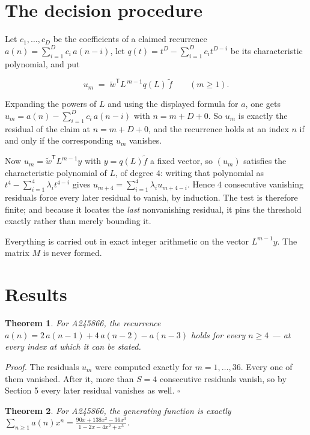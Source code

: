 \documentclass[11pt]{article}
\newtheorem{theorem}{Theorem}
\theoremstyle{definition}
\begin{document}
\section{The decision procedure}

Let $c_1,\dots,c_D$ be the coefficients of a claimed recurrence $a(n) = \sum_{i=1}^{D} c_i\,a(n-i)$, let $q(t) = t^{D} - \sum_{i=1}^{D} c_i t^{D-i}$ be its characteristic polynomial, and put

\[u_m \;=\; \tilde w^{\mathsf T} L^{\,m-1} q(L)\,\tilde f \qquad (m \ge 1).\]

Expanding the powers of $L$ and using the displayed formula for $a$, one gets $u_m = a(n) - \sum_{i=1}^{D} c_i\,a(n-i)$ with $n = m + D + 0$. So $u_m$ is exactly the residual of the claim at $n = m + D + 0$, and the recurrence holds at an index $n$ if and only if the corresponding $u_m$ vanishes.

Now $u_m = \tilde w^{\mathsf T} L^{m-1} y$ with $y = q(L)\tilde f$ a fixed vector, so $(u_m)$ satisfies the characteristic polynomial of $L$, of degree $4$: writing that polynomial as $t^{4} - \sum_{i=1}^{4} \lambda_i t^{4-i}$ gives $u_{m+4} = \sum_{i=1}^{4} \lambda_i u_{m+4-i}$. Hence $4$ consecutive vanishing residuals force every later residual to vanish, by induction. The test is therefore finite; and because it locates the {\itshape last} nonvanishing residual, it pins the threshold exactly rather than merely bounding it.

Everything is carried out in exact integer arithmetic on the vector $L^{m-1}y$. The matrix $M$ is never formed.

\section{Results}

\begin{theorem} For A245866, the recurrence $a(n) = 2\,a(n-1) + 4\,a(n-2) - a(n-3)$ holds for every $n \ge 4$ --- at every index at which it can be stated.\end{theorem}

{\itshape Proof.} The residuals $u_m$ were computed exactly for $m = 1,\dots,36$. Every one of them vanished. After it, more than $S = 4$ consecutive residuals vanish, so by Section 5 every later residual vanishes as well. $\square$

\begin{theorem} For A245866, the generating function is exactly $\sum_{n\ge 1} a(n)x^n = \frac{90x + 138x^{2} - 36x^{3}}{1 - 2x - 4x^{2} + x^{3}}$.\end{theorem}
\end{document}
